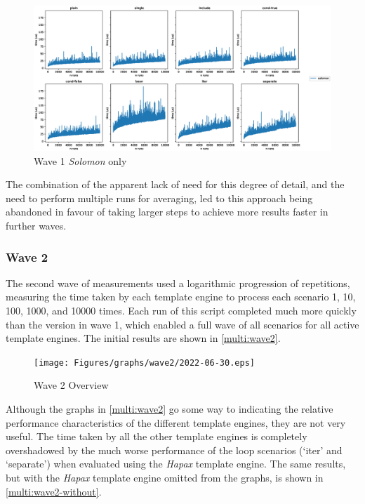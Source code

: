 \begin{figure}[ht!]
\centering
\includegraphics[width=\columnwidth]{Figures/graphs/wave1/Wave1-solomon.eps}
\caption{\label{results:fullsolomon}Wave 1 \emph{Solomon} only}
\end{figure}

The combination of the apparent lack of need for this degree of detail, and the need to perform multiple runs for averaging, led to this approach being abandoned in favour of taking larger steps to achieve more results faster in further waves.

\subsubsection{Wave 2}
\label{comp:wave 2}

The second wave of measurements used a logarithmic progression of repetitions, measuring the time taken by each template engine to process each scenario 1, 10, 100, 1000, and 10000 times. Each run of this script completed much more quickly than the version in wave 1, which enabled a full wave of all scenarios for all active template engines. The initial results are shown in \autoref{multi:wave2}.

\begin{figure}[ht!]
\centering
\texttt{[image: Figures/graphs/wave2/2022-06-30.eps]}
\caption{\label{multi:wave2}Wave 2 Overview}
\end{figure}

Although the graphs in \autoref{multi:wave2} go some way to indicating the relative performance characteristics of the different template engines, they are not very useful. The time taken by all the other template engines is completely overshadowed by the much worse performance of the loop scenarios (`iter' and `separate') when evaluated using the \emph{Hapax} template engine. The same results, but with the \emph{Hapax} template engine omitted from the graphs, is shown in \autoref{multi:wave2-without}.

